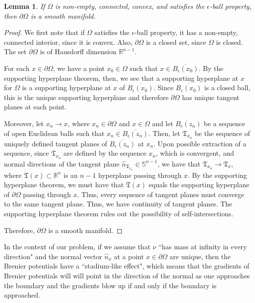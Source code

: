 \documentclass{amsart}
\theoremstyle{lemma}
\newtheorem{lemma}[theorem]{Lemma}
\theoremstyle{remark}
\begin{document}
\begin{lemma}
If $\Omega$ is non-empty, connected, convex, and satisfies the $\epsilon$-ball property, then $\partial \Omega$ is a smooth manifold.
\end{lemma}
\begin{proof}
We first note that if $\Omega$ satisfies the $\epsilon$-ball property, it has a non-empty, connected interior, since it is convex. Also, $\partial \Omega$ is a closed set, since $\Omega$ is closed. The set $\partial \Omega$ is of Hausdorff dimension $\mathbb{R}^{n-1}$.

For each $x \in \partial \Omega$, we have a point $x_0 \in \Omega$ such that $x \in \overline{B_{\epsilon}(x_0)}$. By the supporting hyperplane theorem, then, we see that a supporting hyperplane at $x$ for $\Omega$ is a supporting hyperplane at $x$ of $\overline{B_{\epsilon}(x_0)}$. Since $\overline{B_{\epsilon}(x_0)}$ is a closed ball, this is the unique supporting hyperplane and therefore $\partial \Omega$ has unique tangent planes at each point.

Moreover, let $x_{n} \rightarrow x$, where $x_{n} \in \partial \Omega$ and $x \in \Omega$ and let $B_{\epsilon}(z_{n})$ be a sequence of open Euclidean balls such that $x_{n} \in \overline{B_{\epsilon}(z_n)}$. Then, let $\mathfrak{T}_{x_{n}}$ be the sequence of uniquely defined tangent planes of $\overline{B_{\epsilon}(z_{n})}$ at $x_{n}$. Upon possible extraction of a sequence, since $\mathfrak{T}_{x_{n}}$ are defined by the sequence $x_{n}$, which is convergent, and normal directions of the tangent plane $\hat{n}_{\mathfrak{T}_{x_{n}}} \in \mathbb{S}^{n-1}$, we have that $\mathfrak{T}_{x_{n}} \rightarrow \mathfrak{T}_{x}$, where $\mathfrak{T}(x) \subset \mathbb{R}^n$ is an $n-1$ hyperplane passing through $x$. By the supporting hyperplane theorem, we must have that $\mathfrak{T}(x)$ equals the supporting hyperplane of $\partial \Omega$ passing through $x$. Thus, every sequence of tangent planes must converge to the same tangent plane. Thus, we have continuity of tangent planes. The supporting hyperplane theorem rules out the possibility of self-intersections.

Therefore, $\partial \Omega$ is a smooth manifold.
\end{proof}

In the context of our problem, if we assume that $\nu$ ``has mass at infinity in every direction" and the normal vector $\hat{n}_{x}$ at a point $x \in \partial \Omega$ are unique, then the Brenier potentials have a ``stadium-like effect", which means that the gradients of Brenier potentials will will point in the direction of the normal as one approaches the boundary and the gradients blow up if and only if the boundary is approached.
\end{document}
